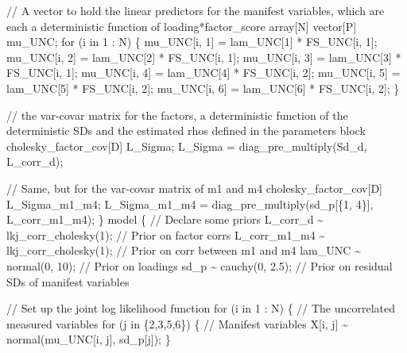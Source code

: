 \documentclass[
  letterpaper,
  DIV=11,
  numbers=noendperiod]{scrreprt}
\newenvironment{Shaded}{\begin{snugshade}}{\end{snugshade}}
\newcommand{\CommentTok}[1]{\textcolor[rgb]{0.37,0.37,0.37}{#1}}
\newcommand{\ControlFlowTok}[1]{\textcolor[rgb]{0.00,0.23,0.31}{#1}}
\newcommand{\DataTypeTok}[1]{\textcolor[rgb]{0.68,0.00,0.00}{#1}}
\newcommand{\DecValTok}[1]{\textcolor[rgb]{0.68,0.00,0.00}{#1}}
\newcommand{\FloatTok}[1]{\textcolor[rgb]{0.68,0.00,0.00}{#1}}
\newcommand{\KeywordTok}[1]{\textcolor[rgb]{0.00,0.23,0.31}{#1}}
\newcommand{\NormalTok}[1]{\textcolor[rgb]{0.00,0.23,0.31}{#1}}
\begin{document}
\begin{Shaded}
\begin{Highlighting}[]
  \CommentTok{// A vector to hold the linear predictors for the manifest variables, which are each a deterministic function of loading*factor\_score}
  \DataTypeTok{array}\NormalTok{[N] }\DataTypeTok{vector}\NormalTok{[P] mu\_UNC;}
  \ControlFlowTok{for}\NormalTok{ (i }\ControlFlowTok{in} \DecValTok{1}\NormalTok{ : N) \{}
\NormalTok{    mu\_UNC[i, }\DecValTok{1}\NormalTok{] = lam\_UNC[}\DecValTok{1}\NormalTok{] * FS\_UNC[i, }\DecValTok{1}\NormalTok{];}
\NormalTok{    mu\_UNC[i, }\DecValTok{2}\NormalTok{] = lam\_UNC[}\DecValTok{2}\NormalTok{] * FS\_UNC[i, }\DecValTok{1}\NormalTok{];}
\NormalTok{    mu\_UNC[i, }\DecValTok{3}\NormalTok{] = lam\_UNC[}\DecValTok{3}\NormalTok{] * FS\_UNC[i, }\DecValTok{1}\NormalTok{];}
\NormalTok{    mu\_UNC[i, }\DecValTok{4}\NormalTok{] = lam\_UNC[}\DecValTok{4}\NormalTok{] * FS\_UNC[i, }\DecValTok{2}\NormalTok{];}
\NormalTok{    mu\_UNC[i, }\DecValTok{5}\NormalTok{] = lam\_UNC[}\DecValTok{5}\NormalTok{] * FS\_UNC[i, }\DecValTok{2}\NormalTok{];}
\NormalTok{    mu\_UNC[i, }\DecValTok{6}\NormalTok{] = lam\_UNC[}\DecValTok{6}\NormalTok{] * FS\_UNC[i, }\DecValTok{2}\NormalTok{];}
\NormalTok{  \}}
  
  \CommentTok{// the var{-}covar matrix for the factors, a deterministic function of the deterministic SDs and the estimated rhos defined in the parameters block}
  \DataTypeTok{cholesky\_factor\_cov}\NormalTok{[D] L\_Sigma;}
\NormalTok{  L\_Sigma = diag\_pre\_multiply(Sd\_d, L\_corr\_d);}

  \CommentTok{// Same, but for the var{-}covar matrix of m1 and m4}
  \DataTypeTok{cholesky\_factor\_cov}\NormalTok{[D] L\_Sigma\_m1\_m4;}
\NormalTok{  L\_Sigma\_m1\_m4 = diag\_pre\_multiply(sd\_p[\{}\DecValTok{1}\NormalTok{, }\DecValTok{4}\NormalTok{\}], L\_corr\_m1\_m4);}
\NormalTok{\}}
\KeywordTok{model}\NormalTok{ \{}
  \CommentTok{// Declare some priors}
\NormalTok{  L\_corr\_d \textasciitilde{} lkj\_corr\_cholesky(}\DecValTok{1}\NormalTok{); }\CommentTok{// Prior on factor corrs}
\NormalTok{  L\_corr\_m1\_m4 \textasciitilde{} lkj\_corr\_cholesky(}\DecValTok{1}\NormalTok{); }\CommentTok{// Prior on corr between m1 and m4}
\NormalTok{  lam\_UNC \textasciitilde{} normal(}\DecValTok{0}\NormalTok{, }\DecValTok{10}\NormalTok{); }\CommentTok{// Prior on loadings}
\NormalTok{  sd\_p \textasciitilde{} cauchy(}\DecValTok{0}\NormalTok{, }\FloatTok{2.5}\NormalTok{); }\CommentTok{// Prior on residual SDs of manifest variables}

  \CommentTok{// Set up the joint log likelihood function}
  \ControlFlowTok{for}\NormalTok{ (i }\ControlFlowTok{in} \DecValTok{1}\NormalTok{ : N) \{}
    \CommentTok{// The uncorrelated measured variables}
    \ControlFlowTok{for}\NormalTok{ (j }\ControlFlowTok{in}\NormalTok{ \{}\DecValTok{2}\NormalTok{,}\DecValTok{3}\NormalTok{,}\DecValTok{5}\NormalTok{,}\DecValTok{6}\NormalTok{\}) \{}
      \CommentTok{// Manifest variables}
\NormalTok{      X[i, j] \textasciitilde{} normal(mu\_UNC[i, j], sd\_p[j]);}
\NormalTok{    \}}


\end{Highlighting}
\end{Shaded}
\end{document}
